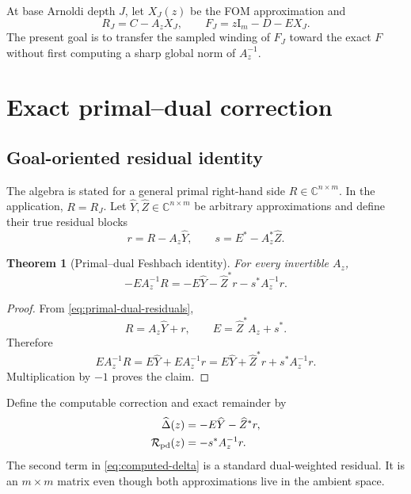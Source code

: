 \documentclass[11pt]{article}
\newtheorem{theorem}{Theorem}[section]
\theoremstyle{definition}
\theoremstyle{remark}
\newcommand{\C}{\mathbb C}
\newcommand{\Id}{\mathrm I}
\begin{document}
At base Arnoldi depth \(J\), let \(X_J(z)\) be the FOM approximation and
\begin{equation}
 R_J=C-A_zX_J,
 \qquad F_J=z\Id_m-D-EX_J.
 \label{eq:base-residual}
\end{equation}
The present goal is to transfer the sampled winding of \(F_J\) toward the
exact \(F\) without first computing a sharp global norm of \(A_z^{-1}\).

\section{Exact primal--dual correction}
\label{sec:identity}

\subsection{Goal-oriented residual identity}

The algebra is stated for a general primal right-hand side
\(R\in\C^{n\times m}\).  In the application, \(R=R_J\).  Let
\(\widehat Y,\widehat Z\in\C^{n\times m}\) be arbitrary approximations
and define their true residual blocks
\begin{equation}
 r=R-A_z\widehat Y,
 \qquad
 s=E^*-A_z^*\widehat Z.
 \label{eq:primal-dual-residuals}
\end{equation}

\begin{theorem}[Primal--dual Feshbach identity]
\label{thm:primal-dual}
For every invertible \(A_z\),
\begin{equation}
 -EA_z^{-1}R
 =-E\widehat Y-\widehat Z^*r-s^*A_z^{-1}r.
 \label{eq:primal-dual-identity}
\end{equation}
\end{theorem}

\begin{proof}
From \cref{eq:primal-dual-residuals},
\[
 R=A_z\widehat Y+r,
 \qquad
 E=\widehat Z^*A_z+s^*.
\]
Therefore
\[
 EA_z^{-1}R
 =E\widehat Y+EA_z^{-1}r
 =E\widehat Y+\widehat Z^*r+s^*A_z^{-1}r.
\]
Multiplication by \(-1\) proves the claim.
\end{proof}

Define the computable correction and exact remainder by
\begin{align}
 \widehat\Delta(z)&=-E\widehat Y-\widehat Z^*r,
 \label{eq:computed-delta}\\
 \mathcal R_{\rm pd}(z)&=-s^*A_z^{-1}r.
 \label{eq:pd-remainder}
\end{align}
The second term in \cref{eq:computed-delta} is a standard dual-weighted
residual.  It is an \(m\times m\) matrix even though both approximations
live in the ambient space.
\end{document}
